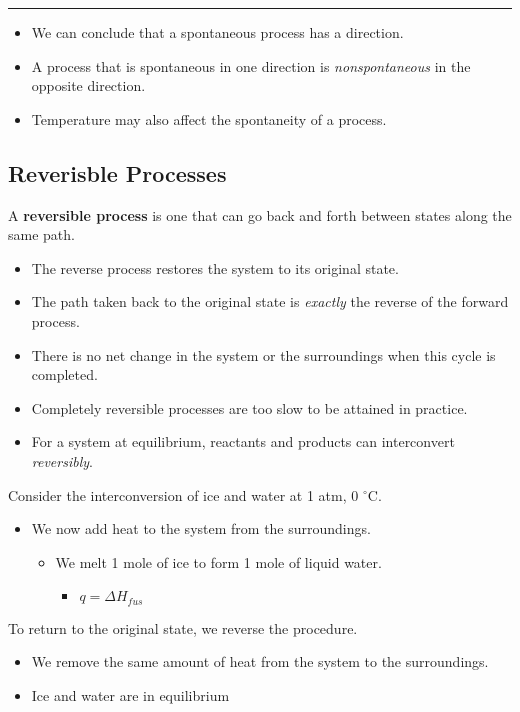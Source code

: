 \documentclass[10pt]{article}
\begin{document}
\rule{\paperwidth}{0.4pt}

\begin{itemize}
    \item We can conclude that a spontaneous process has a direction.
    \item A process that is spontaneous in one direction is \textit{nonspontaneous} in the opposite direction.
    \item Temperature may also affect the spontaneity of a process.
\end{itemize}

\subsection*{Reverisble Processes}
A \textbf{reversible process} is one that can go back and forth between states along the same path.
\begin{itemize}
    \item The reverse process restores the system to its original state.
    \item The path taken back to the original state is \textit{exactly} the reverse of the forward process.
    \item There is no net change in the system or the surroundings when this cycle is completed.
    \item Completely reversible processes are too slow to be attained in practice.
    \item For a system at equilibrium, reactants and products can interconvert \textit{reversibly}.
\end{itemize}
Consider the interconversion of ice and water at 1 atm, 0 $^\circ$C.
\begin{itemize}
    \item We now add heat to the system from the surroundings.
    \begin{itemize}
        \item We melt 1 mole of ice to form 1 mole of liquid water.
        \begin{itemize}
            \item $q = \Delta H_{fus}$
        \end{itemize}
    \end{itemize}
\end{itemize}
To return to the original state, we reverse the procedure.
\begin{itemize}
    \item We remove the same amount of heat from the system to the surroundings.
    \item Ice and water are in equilibrium
\end{itemize}
\end{document}
